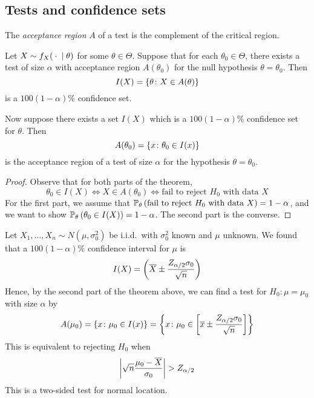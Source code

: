 \subsection{Tests and confidence sets}
\begin{definition}
	The \textit{acceptance region} \( A \) of a test is the complement of the critical region.
\end{definition}
\begin{theorem}
	Let \( X \sim f_X({}\cdot{}\mid\theta) \) for some \( \theta \in \Theta \).
	Suppose that for each \( \theta_0 \in \Theta \), there exists a test of size \( \alpha \) with acceptance region \( A(\theta_0) \) for the  null hypothesis \( \theta = \theta_0 \).
	Then
	\[ I(X) = \qty{\theta \colon X \in A(\theta)} \]
	is a \( 100(1-\alpha)\% \) confidence set.

	Now suppose there exists a set \( I(X) \) which is a \( 100(1-\alpha)\% \) confidence set for \( \theta \).
	Then
	\[ A(\theta_0) = \qty{x \colon \theta_0 \in I(x)} \]
	is the acceptance region of a test of size \( \alpha \) for the hypothesis \( \theta = \theta_0 \).
\end{theorem}
\begin{proof}
	Observe that for both parts of the theorem,
	\[ \theta_0 \in I(X) \iff X \in A(\theta_0) \iff \text{fail to reject } H_0 \text{ with data } X \]
	For the first part, we assume that \( \mathbb{P}_{\theta}\left({\text{fail to reject } H_0 \text{ with data } X}\right) = 1 - \alpha \), and we want to show \( \mathbb{P}_{\theta}\left({\theta_0 \in I(X)}\right) = 1 - \alpha \).
	The second part is the converse.
\end{proof}
\begin{example}
	Let \( X_1, \dots, X_n \sim N(\mu, \sigma_0^2) \) be i.i.d.\ with \( \sigma_0^2 \) known and \( \mu \) unknown.
	We found that a \( 100(1-\alpha)\% \) confidence interval for \( \mu \) is
	\[ I(X) = \qty(\overline X \pm \frac{Z_{\alpha/2}\sigma_0}{\sqrt{n}}) \]
	Hence, by the second part of the theorem above, we can find a test for \( H_0 \colon \mu = \mu_0 \) with size \( \alpha \) by
	\[ A(\mu_0) = \qty{ x \colon \mu_0 \in I(x) } = \qty{ x \colon \mu_0 \in \qty[\overline x \pm \frac{Z_{\alpha/2} \sigma_0}{\sqrt{n}}] } \]
	This is equivalent to rejecting \( H_0 \) when
	\[ \abs{\sqrt{n} \frac{\mu_0 - \overline X}{\sigma_0}} > Z_{\alpha/2} \]
	This is a two-sided test for normal location.
\end{example}
